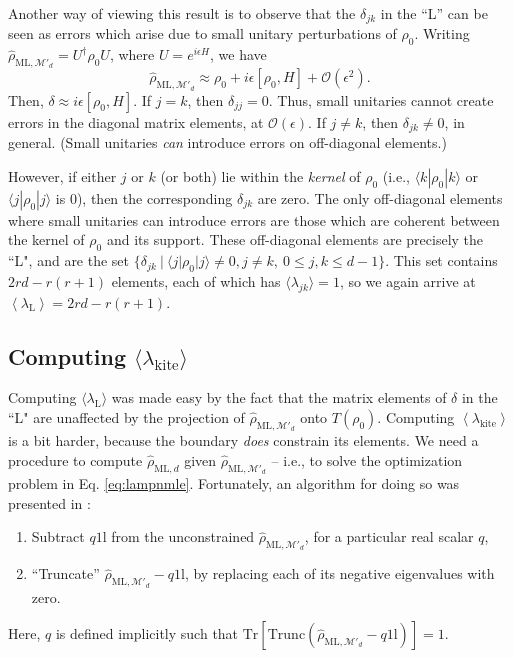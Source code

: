 \documentclass[aps,pra, twocolumn]{revtex4-1}
\newcommand{\M}{\mathcal{M}}
\newcommand{\Tr}{\mathrm{Tr}}
\newcommand{\Id}{\mathbb{I}}
\newcommand{\expect}[1]{\ensuremath{\left\langle#1\right\rangle}}
\def\Id{1\!\mathrm{l}}
\newcommand{\rhohat}{\hat{\rho}}
\newcommand{\rhoML}[1]{\rhohat_{\scriptscriptstyle{\mathrm{ML},#1}}}
\begin{document}
Another way of viewing this result is to observe that the $\delta_{jk}$ in the ``L'' can be seen as errors which arise due to small unitary perturbations of $\rho_{0}$. Writing $\rhoML{\M'_{d}} = U^{\dagger}\rho_{0}U$, where $U=e^{i\epsilon H}$, we have
\[\rhoML{\M'_{d}} \approx \rho_{0} + i\epsilon [\rho_{0},H]+\mathcal{O}(\epsilon^{2}).\]
Then, $\delta \approx i\epsilon [\rho_{0},H]$.
If $j = k$, then $\delta_{jj} = 0$. Thus, small unitaries cannot create errors in the diagonal matrix elements, at $\mathcal{O}(\epsilon)$. If $j \neq k$, then $\delta_{jk} \neq 0$, in general. (Small unitaries \emph{can} introduce errors on off-diagonal elements.)

However, if either $j$ or $k$ (or both) lie within the \emph{kernel} of $\rho_{0}$ (i.e., $\langle k | \rho_{0}| k \rangle$ or $\langle j|\rho_{0}|j\rangle$ is 0), then the corresponding $\delta_{jk}$ are zero. The only off-diagonal elements where small unitaries can introduce errors are those which are coherent between the kernel of $\rho_{0}$ and its support. These off-diagonal elements are precisely the ``L", and are  the set $\{\delta_{jk}~|~\langle j | \rho_{0}|j\rangle \neq 0, j\neq k, ~ 0 \leq j,k \leq d - 1\}$. This set contains $2rd - r(r+1)$ elements, each of which has $\langle \lambda_{jk}\rangle = 1$, so we again arrive at $\expect{\lambda_{\mathrm{L}}} = 2rd - r(r+1)$.

\subsection{Computing $\langle \lambda_\mathrm{kite}\rangle$}
\label{subsec:kite}
Computing $\langle \lambda_{\mathrm{L}}\rangle$ was made easy by the fact that the matrix elements of $\delta$ in the ``L" are unaffected by the projection of $\rhoML{\M'_{d}}$ onto $T(\rho_{0})$. Computing $\expect{\lambda_{\mathrm{kite}}}$ is a bit harder, because the boundary \emph{does} constrain its elements. We need a procedure to compute $\rhoML{d}$ given $\rhoML{\M'_{d}}$ -- i.e., to solve the optimization problem in Eq. \eqref{eq:lampnmle}.  Fortunately, an algorithm for doing so was presented in \cite{Smolin2012}:
\begin{enumerate}[noitemsep]
\item Subtract $q\Id$ from the unconstrained $\rhoML{\M'_{d}}$, for a particular real scalar $q$,
\item ``Truncate'' $\rhoML{\M'_{d}}-q\Id$, by replacing each of its negative eigenvalues with zero.
\end{enumerate}
Here, $q$ is defined implicitly such that $\Tr\left[ \mathrm{Trunc}(\rhoML{\M'_{d}}-q\Id)\right] = 1$.
\end{document}
